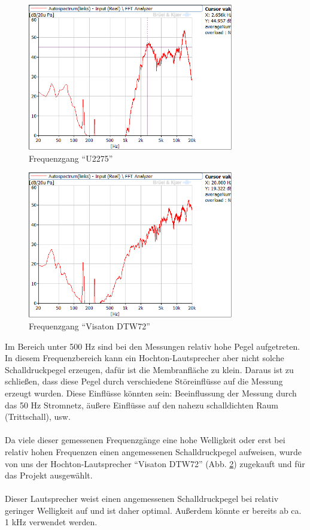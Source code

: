 \begin{figure} [H]
	\centering
	\includegraphics[width=0.8\textwidth]{img/LSMessung/HT/U2275_1m_erhoeht.png}
	\caption{Frequenzgang \enquote{U2275}}
	\label{fig:4.3.5}
\end{figure}

\begin{figure} [H]
	\centering
	\includegraphics[width=0.8\textwidth]{img/LSMessung/HT/VisatonDTW72.png}
	\caption{Frequenzgang \enquote{Visaton DTW72}}
	\label{fig:4.3.6}
\end{figure}
\newpage
Im Bereich unter 500 Hz sind bei den Messungen relativ hohe Pegel aufgetreten.
In diesem Frequenzbereich kann ein Hochton-Lautsprecher aber nicht solche Schalldruckpegel erzeugen, dafür ist die Membranfläche zu klein.
Daraus ist zu schließen, dass diese Pegel durch verschiedene Störeinflüsse auf die Messung erzeugt wurden.
Diese Einflüsse könnten sein: Beeinflussung der Messung durch das 50 Hz Stromnetz, äußere Einflüsse auf den nahezu schalldichten Raum (Trittschall), usw.
\\ \\
Da viele dieser gemessenen Frequenzgänge eine hohe Welligkeit oder erst bei relativ hohen Frequenzen einen angemessenen Schalldruckpegel aufweisen, wurde von uns der Hochton-Lautsprecher \enquote{Visaton DTW72} (Abb. \ref{fig:4.3.6}) zugekauft und für das Projekt ausgewählt.
\\ \\
Dieser Lautsprecher weist einen angemessenen Schalldruckpegel bei relativ geringer Welligkeit auf und ist daher optimal.
Außerdem könnte er bereits ab ca. 1 kHz verwendet werden.

